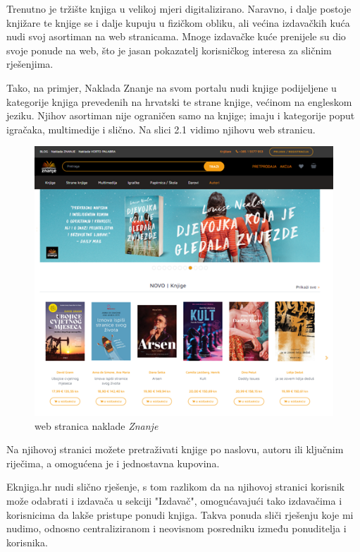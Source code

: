 		Trenutno je tržište knjiga u velikoj mjeri digitalizirano. Naravno, i dalje postoje knjižare te knjige se i dalje kupuju u fizičkom obliku, ali većina izdavačkih kuća nudi svoj asortiman na web stranicama. Mnoge izdavačke kuće prenijele su dio svoje ponude na web, što je jasan pokazatelj korisničkog interesa za sličnim rješenjima.
		
		Tako, na primjer, Naklada Znanje na svom portalu nudi knjige podijeljene u kategorije knjiga prevedenih na hrvatski te strane knjige, većinom na engleskom jeziku. Njihov asortiman nije ograničen samo na knjige; imaju i kategorije poput igračaka, multimedije i slično. Na slici 2.1 vidimo njihovu web stranicu.
		
		\begin{figure}[H]
			\includegraphics[scale=1]{slike/naklada-znanje.PNG} %
			\centering
			\caption{web stranica naklade \textit{Znanje}}
			\label{fig:Naklada Znanje}
		\end{figure}
		
		Na njihovoj stranici možete pretraživati knjige po naslovu, autoru ili ključnim riječima, a omogućena je i jednostavna kupovina.
		
		Eknjiga.hr nudi slično rješenje, s tom razlikom da na njihovoj stranici korisnik može odabrati i izdavača u sekciji "Izdavač", omogućavajući tako izdavačima i korisnicima da lakše pristupe ponudi knjiga. Takva ponuda sliči rješenju koje mi nudimo, odnosno centraliziranom i neovisnom posredniku između ponuditelja i korisnika.
		
